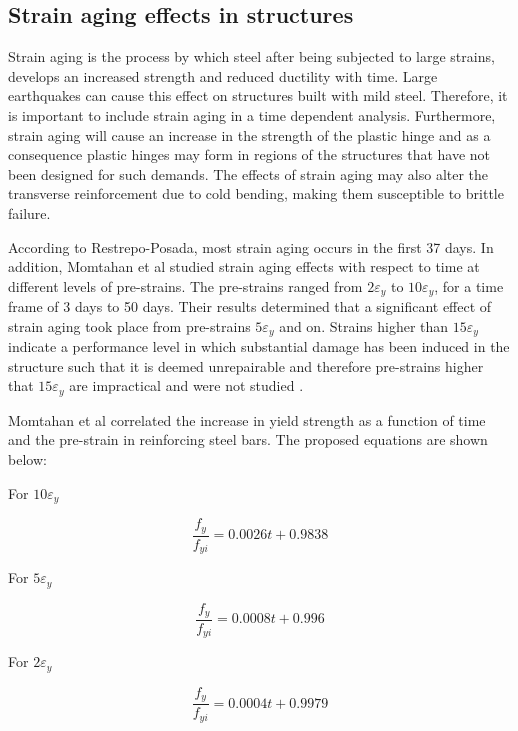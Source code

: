 \subsection{Strain aging effects in structures}

Strain aging is the process by which steel after being subjected to large strains, develops an increased strength and reduced ductility with time. Large earthquakes can cause this effect on structures built with mild steel. Therefore, it is  important to include strain aging in a time dependent analysis. Furthermore, strain aging will cause an increase in the strength of the plastic hinge and as a consequence plastic hinges may form in regions of the structures that have not been designed for such demands. The effects of strain aging may also alter the transverse reinforcement due to cold bending, making them susceptible to brittle failure\cite{Momtahan2009}.

According to Restrepo-Posada\cite{Restrepo-Posada1994}, most strain aging occurs in the first 37 days. In addition, Momtahan et al  \cite{Momtahan2009} studied strain aging effects with respect to time at different levels of pre-strains. The pre-strains ranged from $2\varepsilon_y $ to $10\varepsilon_y$, for a time frame of 3 days to 50 days. Their results determined that a significant effect of strain aging took place from pre-strains $5\varepsilon_y$ and on. Strains higher than $15\varepsilon_y$ indicate a performance level in which substantial damage has been induced in the structure such that it is deemed unrepairable and therefore pre-strains higher that $15\varepsilon_y$ are impractical and were not studied \cite{Momtahan2009}.

Momtahan et al correlated the increase in yield strength as a function of time and the pre-strain in reinforcing steel bars. The proposed equations are shown below:

For $10\varepsilon_y$

\begin{equation}
  \frac{f_y}{f_{yi}}=0.0026t+0.9838
  \label{eq.twelve}
\end{equation} 

For $5\varepsilon_y$

\begin{equation}
  \frac{f_y}{f_{yi}}=0.0008t+0.996
  \label{eq.thirteen}
\end{equation} 

For $2\varepsilon_y$

\begin{equation}
  \frac{f_y}{f_{yi}}=0.0004t+0.9979
  \label{eq.fourteen}
\end{equation} 


